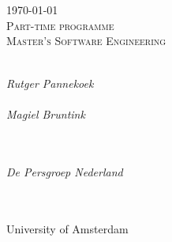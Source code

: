 \begin{titlepage}
\begin{center}

\vspace*{2cm}

{ \huge \textsc{\theTitle} \\[0.6cm] }
{ \large \textsc \theAuthor \\[2cm] }
{ \textsc \today \\[0.2cm] }
{ \large \textsc{Part-time programme \\ Master's Software Engineering} \\[2cm] }

\begin{minipage}[t]{7cm}
\\
\emph{Rutger Pannekoek}\\[1.2cm]

\\
\emph{Magiel Bruntink}
\end{minipage}\hfill\begin{minipage}[t]{7cm}
\begin{flushright}
\\
\emph{\theOrganization \\ De Persgroep Nederland}\\[1.2cm]

\\
\emph{\theStatus}
\end{flushright}
\end{minipage}\\[2cm]

{ \Large \textsc University of Amsterdam }

\end{center}
\end{titlepage}